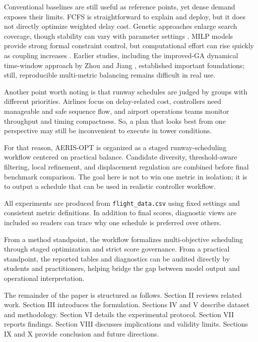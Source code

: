 \documentclass[conference]{IEEEtran}
\begin{document}
Conventional baselines are still useful as reference points, yet dense demand exposes their limits. FCFS is straightforward to explain and deploy, but it does not directly optimize weighted delay cost. Genetic approaches enlarge search coverage, though stability can vary with parameter settings \cite{ref5,ref7}. MILP models provide strong formal constraint control, but computational effort can rise quickly as coupling increases \cite{ref9,ref11}. Earlier studies, including the improved-GA dynamical time-window approach by Zhou and Jiang \cite{ref19}, established important foundations; still, reproducible multi-metric balancing remains difficult in real use.

Another point worth noting is that runway schedules are judged by groups with different priorities. Airlines focus on delay-related cost, controllers need manageable and safe sequence flow, and airport operations teams monitor throughput and timing compactness. So, a plan that looks best from one perspective may still be inconvenient to execute in tower conditions.

For that reason, AERIS-OPT is organized as a staged runway-scheduling workflow centered on practical balance. Candidate diversity, threshold-aware filtering, local refinement, and displacement regulation are combined before final benchmark comparison. The goal here is not to win one metric in isolation; it is to output a schedule that can be used in realistic controller workflow.

All experiments are produced from \texttt{flight\_data.csv} using fixed settings and consistent metric definitions. In addition to final scores, diagnostic views are included so readers can trace why one schedule is preferred over others.

From a method standpoint, the workflow formalizes multi-objective scheduling through staged optimization and strict score governance. From a practical standpoint, the reported tables and diagnostics can be audited directly by students and practitioners, helping bridge the gap between model output and operational interpretation.

The remainder of the paper is structured as follows. Section II reviews related work. Section III introduces the formulation. Sections IV and V describe dataset and methodology. Section VI details the experimental protocol. Section VII reports findings. Section VIII discusses implications and validity limits. Sections IX and X provide conclusion and future directions.
\end{document}
